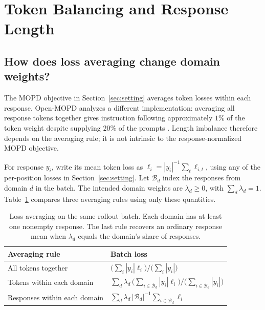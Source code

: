 \section{Token Balancing and Response Length}
\label{sec:normalization}

\subsection{How does loss averaging change domain weights?}

The MOPD objective in Section~\ref{sec:setting} averages token losses
within each response. Open-MOPD analyzes a different implementation:
averaging all response tokens together gives instruction following
approximately $1\%$ of the token weight despite supplying $20\%$ of
the prompts \citep{gao2026openmopddiagnosingfixingcapability}.
Length imbalance therefore depends on the averaging rule; it is not
intrinsic to the response-normalized MOPD objective.

For response $y_i$, write its mean token loss as
$\ell_i=|y_i|^{-1}\sum_t\ell_{i,t}$, using any of the per-position
losses in Section~\ref{sec:setting}. Let $\mathcal B_d$ index the
responses from domain $d$ in the batch. The intended domain weights
are $\lambda_d\geq0$, with $\sum_d\lambda_d=1$.
Table~\ref{tab:normalization} compares three averaging rules using
only these quantities.

\begin{table}[!htbp]
\centering
\small
\renewcommand{\arraystretch}{1.15}
\begin{tabular*}{\linewidth}{@{\extracolsep{\fill}}ll@{}}
\toprule
Averaging rule & Batch loss \\
\midrule
All tokens together
  & $\bigl(\sum_i |y_i|\ell_i\bigr)\big/\bigl(\sum_i |y_i|\bigr)$ \\
Tokens within each domain
  & $\sum_d\lambda_d\,
    \bigl(\sum_{i\in\mathcal B_d}|y_i|\ell_i\bigr)
    \big/\bigl(\sum_{i\in\mathcal B_d}|y_i|\bigr)$ \\
Responses within each domain
  & $\sum_d\lambda_d\,|\mathcal B_d|^{-1}
    \sum_{i\in\mathcal B_d}\ell_i$ \\
\bottomrule
\end{tabular*}
\caption{Loss averaging on the same rollout batch. Each domain has at least
one nonempty response. The last rule recovers an ordinary response mean
when $\lambda_d$ equals the domain's share of responses.}
\label{tab:normalization}
\end{table}

